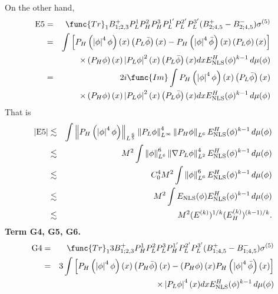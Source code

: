 \documentclass[12pt,letterpaper,leqno]{amsart}
\theoremstyle{plain}
\numberwithin{equation}{section}
\numberwithin{theorem}{section}
\numberwithin{proposition}{section}
\numberwithin{lemma}{section}
\numberwithin{corollary}{section}
\begin{document}
On the other hand,%
\begin{eqnarray*}
\text{E5} &=&\func{Tr}_{1}B_{1;2,3}^{+}P_{L}^{1}P_{H}^{2}P_{H}^{3}P_{L}^{1^{%
\prime }}P_{L}^{2^{\prime }}P_{L}^{3^{\prime
}}(B_{2;4,5}^{+}-B_{2;4,5}^{-})\sigma ^{(5)} \\
&=&\int \left[ P_{H}\left( \left\vert \phi \right\vert ^{4}\phi \right)
(x)\left( P_{L}\bar{\phi}\right) (x)-P_{H}\left( \left\vert \phi \right\vert
^{4}\bar{\phi}\right) (x)\left( P_{L}\phi \right) (x)\right] \\
&&\times \left( P_{H}\phi \right) (x)\left\vert P_{L}\phi \right\vert
^{2}(x)\left( P_{L}\bar{\phi}\right) (x)dxE_{\text{NLS}}^{H}(\phi
)^{k-1}\,d\mu (\phi ) \\
&=&2i\func{Im}\int P_{H}\left( \left\vert \phi \right\vert ^{4}\phi \right)
(x)\left( P_{L}\bar{\phi}\right) (x) \\
&&\times \left( P_{H}\phi \right) (x)\left\vert P_{L}\phi \right\vert
^{2}(x)\left( P_{L}\bar{\phi}\right) (x)dxE_{\text{NLS}}^{H}(\phi
)^{k-1}\,d\mu (\phi )
\end{eqnarray*}%
That is%
\begin{eqnarray*}
\left\vert \text{E5}\right\vert &\lesssim &\int \left\Vert P_{H}\left(
\left\vert \phi \right\vert ^{4}\phi \right) \right\Vert _{L^{\frac{6}{5}%
}}\left\Vert P_{L}\phi \right\Vert _{L^{\infty }}^{4}\left\Vert P_{H}\phi
\right\Vert _{L^{6}}E_{\text{NLS}}^{H}(\phi )^{k-1}\,d\mu (\phi ) \\
&\lesssim &M^{2}\int \left\Vert \phi \right\Vert _{L^{6}}^{6}\left\Vert
\nabla P_{L}\phi \right\Vert _{L^{2}}^{4}E_{\text{NLS}}^{H}(\phi
)^{k-1}\,d\mu (\phi ) \\
&\lesssim &C_{0}^{4}M^{2}\int \left\Vert \phi \right\Vert _{L^{6}}^{6}E_{%
\text{NLS}}^{H}(\phi )^{k-1}\,d\mu (\phi ) \\
&\lesssim &M^{2}\int E_{\text{NLS}}(\phi )E_{\text{NLS}}^{H}(\phi
)^{k-1}\,d\mu (\phi ) \\
&\lesssim &M^{2}(E^{(k)})^{1/k}(E_{H}^{(k)})^{(k-1)/k}.
\end{eqnarray*}%
\textbf{Term G4, G5, G6.}%
\begin{eqnarray*}
\text{G4} &=&\func{Tr}%
_{1}3B_{1;2,3}^{+}P_{H}^{1}P_{L}^{2}P_{L}^{3}P_{H}^{1^{\prime
}}P_{L}^{2^{\prime }}P_{L}^{3^{\prime }}(B_{1;4,5}^{+}-B_{1;4,5}^{-})\sigma
^{(5)} \\
&=&3\int \left[ P_{H}\left( \left\vert \phi \right\vert ^{4}\phi \right)
(x)\left( P_{H}\bar{\phi}\right) (x)-\left( P_{H}\phi \right) (x)P_{H}\left(
\left\vert \phi \right\vert ^{4}\bar{\phi}\right) (x)\right] \\
&&\times \left\vert P_{L}\phi \right\vert ^{4}(x)dxE_{\text{NLS}}^{H}(\phi
)^{k-1}\,d\mu (\phi )
\end{eqnarray*}%
\end{document}
